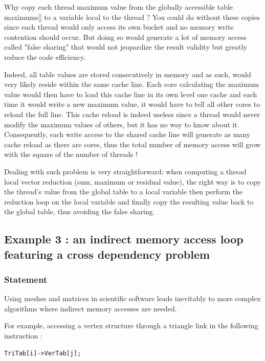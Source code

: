 \documentclass[a4paper,12pt]{article}
\begin{document}
Why copy each thread maximum value from the globally accessible table maximums[] to a variable local to the thread ? You could do without these copies since each thread would only access its own bucket and no memory write contention should occur.
But doing so would generate a lot of memory access called "false sharing" that would not jeopardize the result validity but greatly reduce the code efficiency.

Indeed, all table values are stored consecutively in memory and as such, would very likely reside within the same cache line. Each core calculating the maximum value would then have to load this cache line in its own level one cache and each time it would write a new maximum value, it would have to tell all other cores to reload the full line. This cache reload is indeed useless since a thread would never modify the maximum values of others, but it has no way to know about it. Consequently, each write access to the shared cache line will generate as many cache reload as there are cores, thus the total number of memory access will grow with the square of the number of threads !

Dealing with such problem is very straightforward: when computing a thread local vector reduction (sum, maximum or residual value), the right way is to copy the thread's value from the global table to a local variable then perform the reduction loop on the local variable and finally copy the resulting value back to the global table, thus avoiding the false sharing.

\subsection{Example 3 : an indirect memory access loop featuring a cross dependency problem}

\subsubsection{Statement}

Using meshes and matrices in scientific software leads inevitably to more complex algorithms where indirect memory accesses are needed.

For example, accessing a vertex structure through a triangle link in the following instruction :

\begin{tt}
\begin{verbatim}
TriTab[i]->VerTab[j];
\end{verbatim}
\end{tt}
\normalfont
\end{document}
